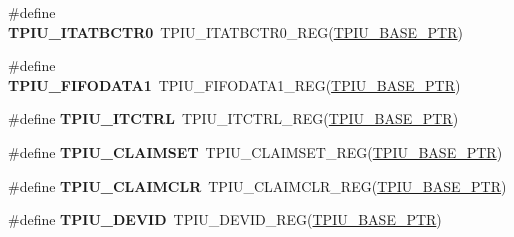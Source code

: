 \begin{DoxyCompactItemize}
\item 
\hypertarget{group___t_p_i_u___register___accessor___macros_gad4d36b3e743687bc954cf918a8f0a669}{}\#define {\bfseries T\+P\+I\+U\+\_\+\+I\+T\+A\+T\+B\+C\+T\+R0}~T\+P\+I\+U\+\_\+\+I\+T\+A\+T\+B\+C\+T\+R0\+\_\+\+R\+E\+G(\hyperlink{group___t_p_i_u___peripheral_ga9294dc3ec1881014ac83408db60de6a0}{T\+P\+I\+U\+\_\+\+B\+A\+S\+E\+\_\+\+P\+T\+R})\label{group___t_p_i_u___register___accessor___macros_gad4d36b3e743687bc954cf918a8f0a669}

\item 
\hypertarget{group___t_p_i_u___register___accessor___macros_ga7da67425c1385faab19d1a21f23f785a}{}\#define {\bfseries T\+P\+I\+U\+\_\+\+F\+I\+F\+O\+D\+A\+T\+A1}~T\+P\+I\+U\+\_\+\+F\+I\+F\+O\+D\+A\+T\+A1\+\_\+\+R\+E\+G(\hyperlink{group___t_p_i_u___peripheral_ga9294dc3ec1881014ac83408db60de6a0}{T\+P\+I\+U\+\_\+\+B\+A\+S\+E\+\_\+\+P\+T\+R})\label{group___t_p_i_u___register___accessor___macros_ga7da67425c1385faab19d1a21f23f785a}

\item 
\hypertarget{group___t_p_i_u___register___accessor___macros_gac8cefc0df562787ac139bf40b88599a0}{}\#define {\bfseries T\+P\+I\+U\+\_\+\+I\+T\+C\+T\+R\+L}~T\+P\+I\+U\+\_\+\+I\+T\+C\+T\+R\+L\+\_\+\+R\+E\+G(\hyperlink{group___t_p_i_u___peripheral_ga9294dc3ec1881014ac83408db60de6a0}{T\+P\+I\+U\+\_\+\+B\+A\+S\+E\+\_\+\+P\+T\+R})\label{group___t_p_i_u___register___accessor___macros_gac8cefc0df562787ac139bf40b88599a0}

\item 
\hypertarget{group___t_p_i_u___register___accessor___macros_gac342a053f478d58d30fd6478f07efa22}{}\#define {\bfseries T\+P\+I\+U\+\_\+\+C\+L\+A\+I\+M\+S\+E\+T}~T\+P\+I\+U\+\_\+\+C\+L\+A\+I\+M\+S\+E\+T\+\_\+\+R\+E\+G(\hyperlink{group___t_p_i_u___peripheral_ga9294dc3ec1881014ac83408db60de6a0}{T\+P\+I\+U\+\_\+\+B\+A\+S\+E\+\_\+\+P\+T\+R})\label{group___t_p_i_u___register___accessor___macros_gac342a053f478d58d30fd6478f07efa22}

\item 
\hypertarget{group___t_p_i_u___register___accessor___macros_ga135968eb8c887f05e402a616313cf241}{}\#define {\bfseries T\+P\+I\+U\+\_\+\+C\+L\+A\+I\+M\+C\+L\+R}~T\+P\+I\+U\+\_\+\+C\+L\+A\+I\+M\+C\+L\+R\+\_\+\+R\+E\+G(\hyperlink{group___t_p_i_u___peripheral_ga9294dc3ec1881014ac83408db60de6a0}{T\+P\+I\+U\+\_\+\+B\+A\+S\+E\+\_\+\+P\+T\+R})\label{group___t_p_i_u___register___accessor___macros_ga135968eb8c887f05e402a616313cf241}

\item 
\hypertarget{group___t_p_i_u___register___accessor___macros_gad9b75f6e89de1971b490ad69ffff4c0c}{}\#define {\bfseries T\+P\+I\+U\+\_\+\+D\+E\+V\+I\+D}~T\+P\+I\+U\+\_\+\+D\+E\+V\+I\+D\+\_\+\+R\+E\+G(\hyperlink{group___t_p_i_u___peripheral_ga9294dc3ec1881014ac83408db60de6a0}{T\+P\+I\+U\+\_\+\+B\+A\+S\+E\+\_\+\+P\+T\+R})\label{group___t_p_i_u___register___accessor___macros_gad9b75f6e89de1971b490ad69ffff4c0c}


\end{DoxyCompactItemize}
